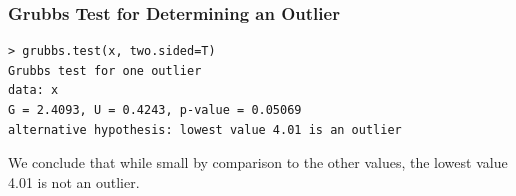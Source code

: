 \documentclass[a4]{beamer}
\begin{document}
\begin{frame}[fragile]
\frametitle{Grubbs Test for Determining an Outlier}
\vspace{-1cm}
\begin{verbatim}
> grubbs.test(x, two.sided=T)
Grubbs test for one outlier
data: x
G = 2.4093, U = 0.4243, p-value = 0.05069
alternative hypothesis: lowest value 4.01 is an outlier
\end{verbatim}
We conclude that while small by comparison to the other values, the lowest value 4.01 is not an outlier.
\end{frame}
\end{document}
